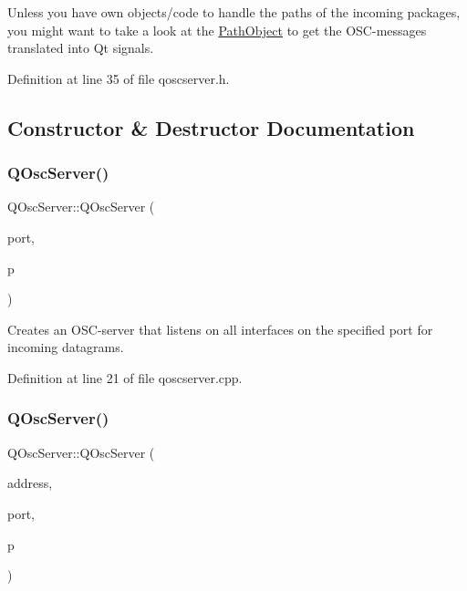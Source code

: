 Unless you have own objects/code to handle the paths of the incoming packages, you might want to take a look at the \hyperlink{class_path_object}{Path\+Object} to get the O\+S\+C-\/messages translated into Qt signals. 

Definition at line 35 of file qoscserver.\+h.



\subsection{Constructor \& Destructor Documentation}
\mbox{\label{class_q_osc_server_a716b6c146062536a806f0ba4ebea89f3}} 
\subsubsection{\texorpdfstring{Q\+Osc\+Server()}{QOscServer()}\hspace{0.1cm}{\footnotesize\ttfamily [1/2]}}
{\footnotesize\ttfamily Q\+Osc\+Server\+::\+Q\+Osc\+Server (\begin{DoxyParamCaption}\item[{quint16}]{port,  }\item[{Q\+Object $\ast$}]{p }\end{DoxyParamCaption})}

Creates an O\+S\+C-\/server that listens on all interfaces on the specified port for incoming datagrams. 

Definition at line 21 of file qoscserver.\+cpp.

\mbox{\label{class_q_osc_server_aa16761b226471d81b82c6e578506f16b}} 
\subsubsection{\texorpdfstring{Q\+Osc\+Server()}{QOscServer()}\hspace{0.1cm}{\footnotesize\ttfamily [2/2]}}
{\footnotesize\ttfamily Q\+Osc\+Server\+::\+Q\+Osc\+Server (\begin{DoxyParamCaption}\item[{Q\+Host\+Address}]{address,  }\item[{quint16}]{port,  }\item[{Q\+Object $\ast$}]{p }\end{DoxyParamCaption})}

